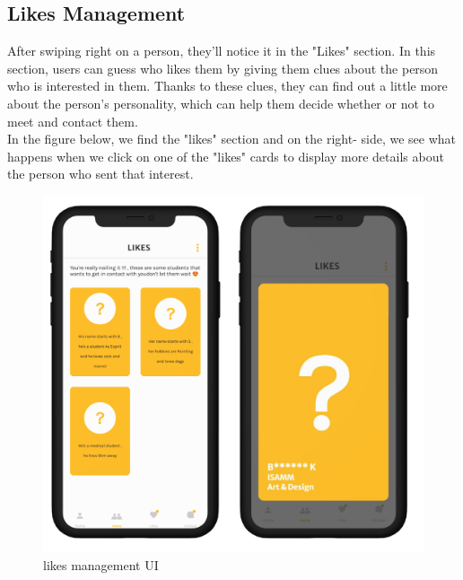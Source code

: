 \subsection{Likes Management}
After swiping right on a person, they'll notice it in the "Likes" section. In this section, users can guess who likes them by giving them clues about the person who is interested in them. Thanks to these clues, they can find out a little more about the person's personality, which can help them decide whether or not to meet and contact them. \\
In the figure below, we find the "likes" section and on the right- side, we see what happens when we click on one of the "likes" cards to display more details about the person who sent that interest.
\begin{figure}[H] 
            \centering
            \includegraphics[scale=0.2]{like ui.png}
            \caption{likes management UI} 
            \label{fig: likes management UI}
\end{figure}

